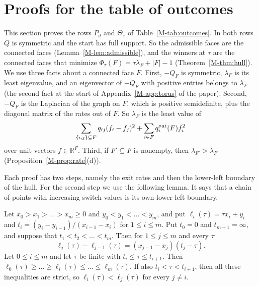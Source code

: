 \documentclass[EJP,preprint]{ejpecp}
\newcommand{\mref}[1]{\ref*{M-#1}}
\newcommand{\R}{\mathbb{R}}
\begin{document}
\section{Proofs for the table of outcomes}\label{supp:examples}\label{app:examples}

This section proves the rows $P_d$ and $\Theta_\varepsilon$ of
Table~\mref{tab:outcomes}. In both rows $Q$ is symmetric and the start has full
support. So the admissible faces are the connected faces
(Lemma~\mref{lem:admissible}), and the winners at $\tau$ are the connected faces
that minimize $\Phi_\tau(F)=\tau\lambda_F+\lvert F\rvert-1$
(Theorem~\mref{thm:hull}). We use three facts about a connected face $F$. First,
$-Q_F$ is symmetric, $\lambda_F$ is its least eigenvalue, and an eigenvector of
$-Q_F$ with positive entries belongs to $\lambda_F$ (the second fact at the
start of Appendix~\mref{app:torus} of the paper). Second, $-Q_F$ is the Laplacian of the
graph on $F$, which is positive semidefinite, plus the diagonal matrix of the
rates out of $F$. So $\lambda_F$ is the least value of
\begin{equation}\label{eq:rayleigh}
 \sum_{\{i,j\}\subseteq F}q_{ij}(f_i-f_j)^2+\sum_{i\in F}q_i^{\rm out}(F)f_i^2
\end{equation}
over unit vectors $f\in\R^F$. Third, if $F'\subsetneq F$ is nonempty, then
$\lambda_{F'}>\lambda_F$ (Proposition~\mref{prop:rate}(d)).

Each proof has two steps, namely the exit rates and then the lower-left boundary
of the hull. For the second step we use the following lemma. It says that a
chain of points with increasing switch values is its own lower-left boundary.

\begin{lemma}\label{lem:chain}
Let $x_0>x_1>\dots>x_m\ge0$ and $y_0<y_1<\dots<y_m$, and put
$\ell_i(\tau)=\tau x_i+y_i$ and $t_i=(y_i-y_{i-1})/(x_{i-1}-x_i)$ for
$1\le i\le m$. Put $t_0=0$ and $t_{m+1}=\infty$, and suppose that
$t_1<t_2<\dots<t_m$. Then for $1\le j\le m$ and every $\tau$
\begin{equation}\label{eq:chain}
 \ell_j(\tau)-\ell_{j-1}(\tau)=(x_{j-1}-x_j)(t_j-\tau).
\end{equation}
Let $0\le i\le m$ and let $\tau$ be finite with $t_i\le\tau\le t_{i+1}$. Then
$\ell_0(\tau)\ge\dots\ge\ell_i(\tau)\le\dots\le\ell_m(\tau)$. If also
$t_i<\tau<t_{i+1}$, then all these inequalities are strict, so
$\ell_i(\tau)<\ell_j(\tau)$ for every $j\ne i$.
\end{lemma}
\end{document}
